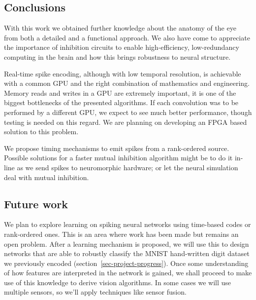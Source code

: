 \subsection{Conclusions}
With this work we obtained further knowledge about the anatomy of the eye from 
both a detailed and a functional approach. We also have come to appreciate the 
importance of inhibition circuits to enable high-efficiency, low-redundancy 
computing in the brain and how this brings robustness to neural structure. 

Real-time spike encoding, although with low temporal resolution, is achievable 
with a common GPU and the right combination of mathematics and 
engineering. Memory reads and writes in a GPU are extremely important, it is 
one of the biggest bottlenecks of the presented algorithms. If each convolution 
was to be performed by a different GPU, we expect to see much better 
performance, though testing is needed on this regard. We are planning on 
developing an FPGA based solution to this problem.

We propose timing mechanisms to emit spikes from a rank-ordered
source. Possible solutions for a faster mutual inhibition algorithm 
might be to do it in-line as we send spikes to neuromorphic hardware; 
or let the neural simulation deal with mutual inhibition.

\subsection{Future work}
We plan to explore learning on spiking neural networks using time-based codes or
rank-ordered ones. This is an area where work has been made but remains an
open problem.
After a learning mechanism is proposed, we will use this to design networks that
are able to robustly classify the MNIST hand-written digit dataset we 
previously encoded (section~\ref{sec-project-progress}). Once some 
understanding of how features are interpreted in the network is gained, we 
shall proceed to make use of this knowledge to derive vision algorithms. In 
some cases we will use multiple sensors, so we'll apply techniques like 
sensor fusion.


